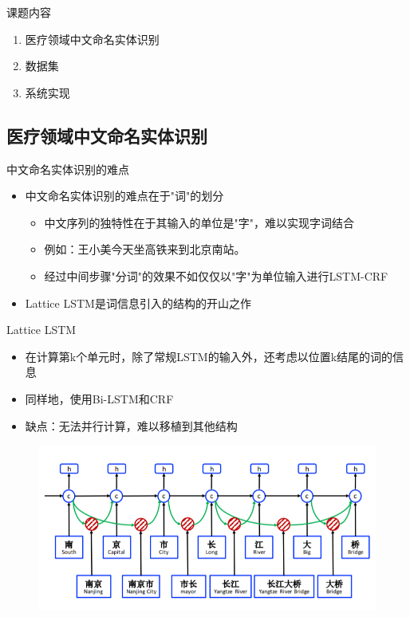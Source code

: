 \documentclass[notheorems, aspectratio=54, compress]{beamer}
\begin{document}
\begin{frame}{课题内容}

  \begin{enumerate}
    \item 医疗领域中文命名实体识别
    \item 数据集
    \item 系统实现
  \end{enumerate}
\end{frame}

\subsection{医疗领域中文命名实体识别}

\begin{frame}{中文命名实体识别的难点}
	\begin{itemize}
		\item 中文命名实体识别的难点在于"词"的划分
		\begin{itemize}
			\item 中文序列的独特性在于其输入的单位是"字"，难以实现字词结合
			\item 例如：王小美今天坐高铁来到北京南站。
			\item 经过中间步骤"分词"的效果不如仅仅以"字"为单位输入进行LSTM-CRF 	
		\end{itemize}
		\item Lattice LSTM\cite{zhang2018chinese}是词信息引入的结构的开山之作
	\end{itemize}
\end{frame}

\begin{frame}{Lattice LSTM}
	\begin{itemize}
		\item 在计算第k个单元时，除了常规LSTM的输入外，还考虑以位置k结尾的词的信息
		\item 同样地，使用Bi-LSTM和CRF
		\item 缺点：无法并行计算，难以移植到其他结构
	\end{itemize}
	\begin{figure}
		\centering
		\includegraphics[width=0.8\linewidth,height=0.5\textheight,keepaspectratio]{Lattice LSTM structure}
	\end{figure}
\end{frame}
\end{document}
